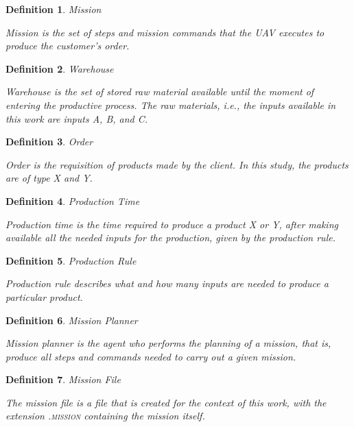 \documentclass[conference,harvard,brazil,english]{sbatex}
\newtheorem{myDefinition}{Definition}
\begin{document}
\begin{myDefinition}{Mission} 

Mission is the set of steps and mission commands that the UAV executes to produce the customer's order.
\label{def:mission}
\end{myDefinition}

\begin{myDefinition}{Warehouse}

Warehouse is the set of stored raw material available until the moment of entering the productive process. The raw materials, i.e., the inputs available in this work are inputs A, B, and C.
\label{def:almoxarifado}
\end{myDefinition}

\begin{myDefinition}{Order}

Order is the requisition of products made by the client. In this study, the products are of type X and Y.
\label{def:pedido}
\end{myDefinition}

\begin{myDefinition}{Production Time}

Production time is the time required to produce a product X or Y, after making available all the needed inputs for the production, given by the production rule.
\label{def:tempoProducao}
\end{myDefinition}

\begin{myDefinition}{Production Rule}

Production rule describes what and how many inputs are needed to produce a particular product.
\label{def:regraProducao}
\end{myDefinition}

\begin{myDefinition}{Mission Planner}

Mission planner is the agent who performs the planning of a mission, that is, produce all steps and commands needed to carry out a given mission.
\label{def:planejadorMissao}
\end{myDefinition}

\begin{myDefinition}{Mission File}

The mission file is a file that is created for the context of this work, with the extension \textsc{.mission} containing the mission itself.
\label{def:arquivoMissao}
\end{myDefinition}
\end{document}
